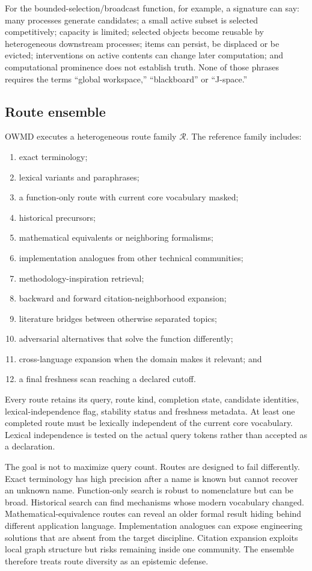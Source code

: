 For the bounded-selection/broadcast function, for example, a signature can say: many processes generate candidates; a small active subset is selected competitively; capacity is limited; selected objects become reusable by heterogeneous downstream processes; items can persist, be displaced or be evicted; interventions on active contents can change later computation; and computational prominence does not establish truth. None of those phrases requires the terms ``global workspace,'' ``blackboard'' or ``J-space.''

\subsection{Route ensemble}

OWMD executes a heterogeneous route family \(\mathcal R\). The reference family includes:

\begin{enumerate}[leftmargin=*]
\item exact terminology;
\item lexical variants and paraphrases;
\item a function-only route with current core vocabulary masked;
\item historical precursors;
\item mathematical equivalents or neighboring formalisms;
\item implementation analogues from other technical communities;
\item methodology-inspiration retrieval;
\item backward and forward citation-neighborhood expansion;
\item literature bridges between otherwise separated topics;
\item adversarial alternatives that solve the function differently;
\item cross-language expansion when the domain makes it relevant; and
\item a final freshness scan reaching a declared cutoff.
\end{enumerate}

Every route retains its query, route kind, completion state, candidate identities, lexical-independence flag, stability status and freshness metadata. At least one completed route must be lexically independent of the current core vocabulary. Lexical independence is tested on the actual query tokens rather than accepted as a declaration.

The goal is not to maximize query count. Routes are designed to fail differently. Exact terminology has high precision after a name is known but cannot recover an unknown name. Function-only search is robust to nomenclature but can be broad. Historical search can find mechanisms whose modern vocabulary changed. Mathematical-equivalence routes can reveal an older formal result hiding behind different application language. Implementation analogues can expose engineering solutions that are absent from the target discipline. Citation expansion exploits local graph structure but risks remaining inside one community. The ensemble therefore treats route diversity as an epistemic defense.

